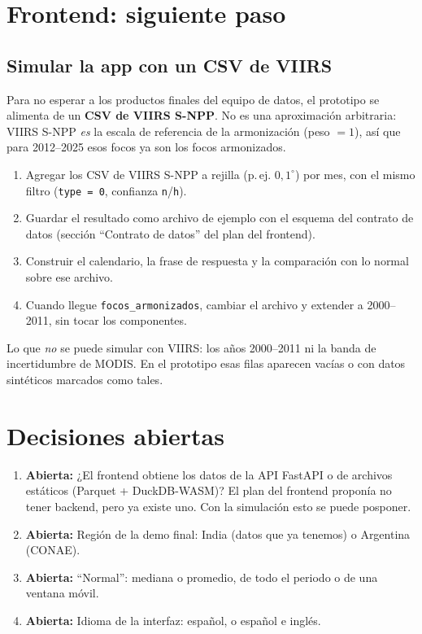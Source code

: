 \documentclass[11pt,a4paper]{article}
\newcommand{\abierta}[1]{\textcolor{orange!80!black}{\textbf{Abierta:}} #1}
\begin{document}
\section{Frontend: siguiente paso}

\subsection*{Simular la app con un CSV de VIIRS}
Para no esperar a los productos finales del equipo de datos, el prototipo se alimenta de
un \textbf{CSV de VIIRS S-NPP}. No es una aproximación arbitraria: VIIRS S-NPP \emph{es} la
escala de referencia de la armonización (peso $= 1$), así que para 2012--2025 esos focos ya son
los focos armonizados.

\begin{enumerate}
  \item Agregar los CSV de VIIRS S-NPP a rejilla (p.\,ej. $0{,}1^\circ$) por mes, con el
        mismo filtro (\texttt{type = 0}, confianza \texttt{n}/\texttt{h}).
  \item Guardar el resultado como archivo de ejemplo con el esquema del contrato de datos
        (sección ``Contrato de datos'' del plan del frontend).
  \item Construir el calendario, la frase de respuesta y la comparación con lo normal sobre
        ese archivo.
  \item Cuando llegue \texttt{focos\_armonizados}, cambiar el archivo y extender a 2000--2011,
        sin tocar los componentes.
\end{enumerate}

Lo que \emph{no} se puede simular con VIIRS: los años 2000--2011 ni la banda de
incertidumbre de MODIS. En el prototipo esas filas aparecen vacías o con datos sintéticos
marcados como tales.

\section{Decisiones abiertas}

\begin{enumerate}
  \item \abierta{¿El frontend obtiene los datos de la API FastAPI o de archivos estáticos
        (Parquet + DuckDB-WASM)? El plan del frontend proponía no tener backend, pero ya existe
        uno. Con la simulación esto se puede posponer.}
  \item \abierta{Región de la demo final: India (datos que ya tenemos) o Argentina (CONAE).}
  \item \abierta{``Normal'': mediana o promedio, de todo el periodo o de una ventana móvil.}
  \item \abierta{Idioma de la interfaz: español, o español e inglés.}
\end{enumerate}
\end{document}
